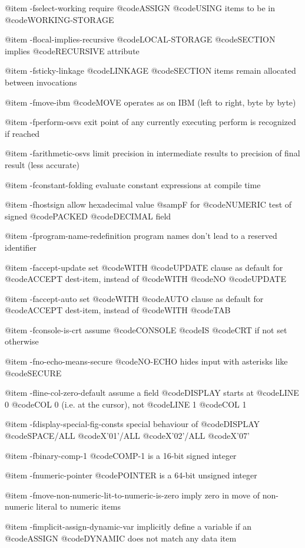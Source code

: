 @item -fselect-working
require @code{ASSIGN} @code{USING} items to be in @code{WORKING-STORAGE}

@item -flocal-implies-recursive
@code{LOCAL-STORAGE} @code{SECTION} implies @code{RECURSIVE} attribute

@item -fsticky-linkage
@code{LINKAGE} @code{SECTION} items remain allocated between invocations

@item -fmove-ibm
@code{MOVE} operates as on IBM (left to right, byte by byte)

@item -fperform-osvs
exit point of any currently executing perform is recognized if reached

@item -farithmetic-osvs
limit precision in intermediate results to precision of final result (less accurate)

@item -fconstant-folding
evaluate constant expressions at compile time

@item -fhostsign
allow hexadecimal value @samp{F} for @code{NUMERIC} test of signed @code{PACKED} @code{DECIMAL} field

@item -fprogram-name-redefinition
program names don't lead to a reserved identifier

@item -faccept-update
set @code{WITH} @code{UPDATE} clause as default for @code{ACCEPT} dest-item, instead of @code{WITH} @code{NO} @code{UPDATE}

@item -faccept-auto
set @code{WITH} @code{AUTO} clause as default for @code{ACCEPT} dest-item, instead of @code{WITH} @code{TAB}

@item -fconsole-is-crt
assume @code{CONSOLE} @code{IS} @code{CRT} if not set otherwise

@item -fno-echo-means-secure
@code{NO-ECHO} hides input with asterisks like @code{SECURE}

@item -fline-col-zero-default
assume a field @code{DISPLAY} starts at @code{LINE 0} @code{COL 0} (i.e. at the cursor), not @code{LINE 1} @code{COL 1}

@item -fdisplay-special-fig-consts
special behaviour of @code{DISPLAY} @code{SPACE/ALL} @code{X'01'/ALL} @code{X'02'/ALL} @code{X'07'}

@item -fbinary-comp-1
@code{COMP-1} is a 16-bit signed integer

@item -fnumeric-pointer
@code{POINTER} is a 64-bit unsigned integer

@item -fmove-non-numeric-lit-to-numeric-is-zero
imply zero in move of non-numeric literal to numeric items

@item -fimplicit-assign-dynamic-var
implicitly define a variable if an @code{ASSIGN} @code{DYNAMIC} does not match any data item

